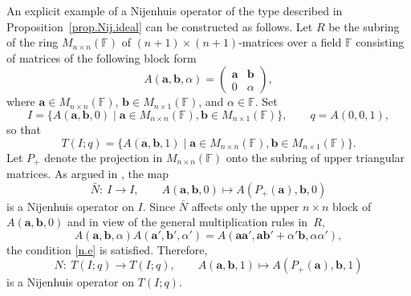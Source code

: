 \documentclass[pdftex]{sigma}
\numberwithin{equation}{section}
\newcommand{\F}{\mathbb F}
\begin{document}
\begin{Example}\label{ex.proj}
An explicit example of a Nijenhuis operator of the type described in Proposition~\ref{prop.Nij.ideal} can be constructed as follows. Let $R$ be the subring of the ring $M_{n\times n}(\F)$ of $(n+1)\times (n+1)$-matrices over a field $\F$ consisting of matrices of the following block form
\[
A(\mathbf{a}, \mathbf{b}, \alpha) =
\begin{pmatrix}
 \mathbf{a} & \mathbf{b}\\
 0 & \alpha
\end{pmatrix},
\]
where $\mathbf{a}\in M_{n\times n}(\F)$, $\mathbf{b}\in M_{n\times 1}(\F)$, and $\alpha \in \F$. Set
\[
I = \{A(\mathbf{a}, \mathbf{b}, 0)\;|\; \mathbf{a}\in M_{n\times n}(\F), \mathbf{b}\in M_{n\times 1}(\F)\}, \qquad q= A(0,0,1),
\]
so that
\[
T(I;q) = \{A(\mathbf{a}, \mathbf{b}, 1)\;|\; \mathbf{a}\in M_{n\times n}(\F), \mathbf{b}\in M_{n\times 1}(\F)\}.
\]
Let $P_+$ denote the projection in $M_{n\times n}(\F)$ onto the subring of upper triangular matrices. As argued in \cite[Example~1]{4}, the map
\[
\bar{N}\colon\ I\to I, \qquad A(\mathbf{a}, \mathbf{b}, 0) \mapsto A(P_+(\mathbf{a}), \mathbf{b}, 0)
\]
is a Nijenhuis operator on $I$. Since $\bar{N}$ affects only the upper $n\times n$ block of $A(\mathbf{a}, \mathbf{b}, 0)$ and in view of the general multiplication rules in~$R$,
\[
A(\mathbf{a}, \mathbf{b}, \alpha)A(\mathbf{a'}, \mathbf{b'}, \alpha') = A(\mathbf{a}\mathbf{a'}, \mathbf{a}\mathbf{b'} +\alpha' \mathbf{b}, \alpha \alpha'),
\]
the condition \eqref{n.e} is satisfied. Therefore,
\[
{N}\colon\ T(I;q) \to T(I;q), \qquad A(\mathbf{a}, \mathbf{b}, 1) \mapsto A(P_+(\mathbf{a}), \mathbf{b}, 1)
\]
is a Nijenhuis operator on $T(I;q)$.
\end{Example}
\end{document}

